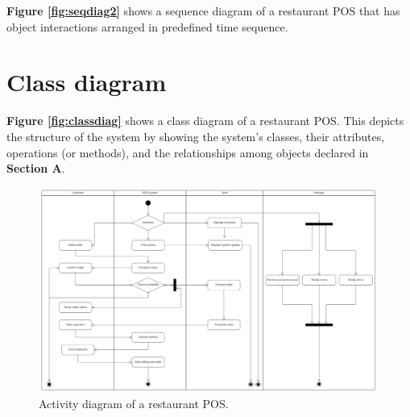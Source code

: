 \documentclass[12pt, a4paper]{article}
\theoremstyle{styleth}
\theoremstyle{styledef}
\begin{document}
\textbf{Figure \ref{fig:seqdiag2}} shows a sequence diagram of a restaurant POS that has object interactions arranged in predefined time sequence.

\section{Class diagram} 

\textbf{Figure \ref{fig:classdiag}} shows a class diagram of a restaurant POS. This depicts the structure of the system by showing the system's classes, their attributes, operations (or methods), and the relationships among objects declared in \textbf{Section A}.


\begin{figure}
	\centering
	\includegraphics[width=23cm]{Screenshot 2022-03-05 180519.png}
	\caption{Activity diagram of a restaurant POS.}
	\label{fig:actdiag}
\end{figure}
\end{document}
